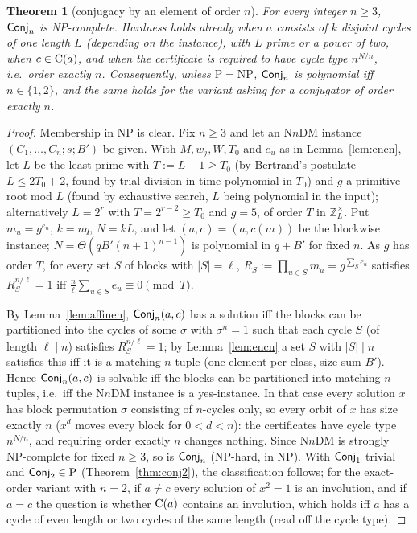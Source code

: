 \documentclass[preprint,12pt]{elsarticle}
\newtheorem{thm}{Theorem}[section]\newtheorem{lem}[thm]{Lemma}\newtheorem{cor}[thm]{Corollary}\newtheorem{prop}[thm]{Proposition}
\theoremstyle{definition}\newtheorem{defi}[thm]{Definition}\newtheorem{prob}[thm]{Problem}\newtheorem{obs}[thm]{Observation}
\theoremstyle{remark}\newtheorem{rem}[thm]{Remark}
\newcommand{\ZZ}{\mathbb Z}\newcommand{\Sym}{\operatorname{Sym}}\newcommand{\Alt}{\operatorname{Alt}}
\begin{document}
\begin{thm}[conjugacy by an element of order $n$]\label{thm:conjn}\label{thm:conjp}
For every integer $n\ge3$, $\mathsf{Conj}_{n}$ is NP-complete. Hardness holds already when $a$ consists of $k$ disjoint cycles of one length $L$ (depending on the instance), with $L$ prime or a power of two, when $c\in\operatorname{C}(a)$, and when the certificate is required to have cycle type
$n^{N/n}$, i.e.\ order exactly $n$. Consequently, unless $\mathrm P=\mathrm{NP}$, $\mathsf{Conj}_{n}$ is polynomial iff $n\in\{1,2\}$,
and the same holds for the variant asking for a conjugator of order exactly $n$.
\end{thm}
\begin{proof}
Membership in NP is clear. Fix $n\ge3$ and let an $\mathrm{N}n\mathrm{DM}$ instance $(C_1,\dots,C_n;s;B')$ be given. With $M,w_j,W,T_0$
and $e_u$ as in Lemma~\ref{lem:encn}, let $L$ be the least prime with $T:=L-1\ge T_0$ (by Bertrand's postulate $L\le2T_0+2$, found by trial
division in time polynomial in $T_0$) and $g$ a primitive root mod $L$ (found by exhaustive search, $L$ being polynomial in the input);
alternatively $L=2^{r}$ with $T=2^{r-2}\ge T_0$ and $g=5$, of order $T$ in $\ZZ_L^{\times}$. Put $m_u=g^{e_u}$, $k=nq$, $N=kL$, and let
$(a,c)=(a,c(m))$ be the blockwise instance; $N=\Theta(qB'(n+1)^{n-1})$ is polynomial in $q+B'$ for fixed $n$. As $g$ has order $T$,
for every set $S$ of blocks with $|S|=\ell$, $R_S:=\prod_{u\in S}m_u=g^{\sum_Se_u}$ satisfies
$R_S^{n/\ell}=1$ iff $\frac n\ell\sum_{u\in S}e_u\equiv0\pmod T$.

By Lemma~\ref{lem:affinen}, $\mathsf{Conj}_{n}(a,c)$ has a solution iff the blocks can be partitioned into the cycles of some
$\sigma$ with $\sigma^{n}=1$ such that each cycle $S$ (of length $\ell\mid n$) satisfies $R_S^{n/\ell}=1$; by Lemma~\ref{lem:encn} a set
$S$ with $|S|\mid n$ satisfies this iff it is a matching $n$-tuple (one element per class, size-sum $B'$). Hence
$\mathsf{Conj}_{n}(a,c)$ is solvable iff the blocks can be partitioned into matching $n$-tuples, i.e.\ iff the $\mathrm{N}n\mathrm{DM}$
instance is a yes-instance. In that case every solution $x$ has block permutation $\sigma$ consisting of $n$-cycles only, so every
orbit of $x$ has size exactly $n$ ($x^{d}$ moves every block for $0<d<n$): the certificates have cycle type $n^{N/n}$, and
requiring order exactly $n$ changes nothing. Since $\mathrm{N}n\mathrm{DM}$ is strongly NP-complete for fixed $n\ge3$, so is
$\mathsf{Conj}_{n}$ (NP-hard, in NP). With $\mathsf{Conj}_{1}$ trivial and $\mathsf{Conj}_{2}\in\mathrm P$ (Theorem~\ref{thm:conj2}), the classification
follows; for the exact-order variant with $n=2$, if $a\ne c$ every solution of $x^{2}=1$ is an involution, and if $a=c$ the question is
whether $\operatorname{C}(a)$ contains an involution, which holds iff $a$ has a cycle of even length or two cycles of the same length (read off the
cycle type).
\end{proof}
\end{document}
